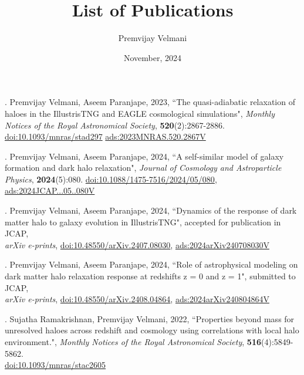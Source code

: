 \documentclass[12pt]{article}
\title{List of Publications}
\author{Premvijay Velmani}
\date{November, 2024}
\newcommand{\doi}[1]{\href{https://doi.org/#1}{doi:#1}}
\begin{document}
\maketitle


. Premvijay Velmani, Aseem Paranjape, 2023, ``The quasi-adiabatic relaxation of haloes in the IllustrisTNG and EAGLE cosmological simulations", \textit{Monthly Notices of the Royal Astronomical Society}, 
\textbf{520}(2):2867-2886. 
\doi{10.1093/mnras/stad297}
\href{https://ui.adsabs.harvard.edu/abs/2023MNRAS.520.2867V}{ads:2023MNRAS.520.2867V}


\vspace{0.5cm}

. Premvijay Velmani, Aseem Paranjape, 2024, ``A self-similar model of galaxy formation and dark halo relaxation", \textit{Journal of Cosmology and Astroparticle Physics}, 
\textbf{2024}(5):080. 
\doi{10.1088/1475-7516/2024/05/080},
\href{https://ui.adsabs.harvard.edu/abs/2024JCAP...05..080V}{ads:2024JCAP...05..080V}

\vspace{0.5cm}

. Premvijay Velmani, Aseem Paranjape, 2024, ``Dynamics of the response of dark matter halo to galaxy evolution in IllustrisTNG", accepted for publication in JCAP, \\ \textit{arXiv e-prints},
\doi{10.48550/arXiv.2407.08030}, 
\href{https://ui.adsabs.harvard.edu/abs/2024arXiv240708030V}{ads:2024arXiv240708030V}

\vspace{0.5cm}

. Premvijay Velmani, Aseem Paranjape, 2024, ``Role of astrophysical modeling on dark matter halo relaxation response at redshifts z = 0 and z = 1", submitted to JCAP, \\ \textit{arXiv e-prints},
\doi{10.48550/arXiv.2408.04864}, 
\href{https://ui.adsabs.harvard.edu/abs/2024arXiv240804864V}{ads:2024arXiv240804864V}

\vspace{0.5cm}

. Sujatha Ramakrishnan, Premvijay Velmani, 2022, ``Properties beyond mass
for unresolved haloes across redshift and cosmology using correlations with local halo environment.", \textit{Monthly Notices of the Royal Astronomical Society}, 
\textbf{516}(4):5849-5862. \\
\doi{10.1093/mnras/stac2605}
\end{document}
